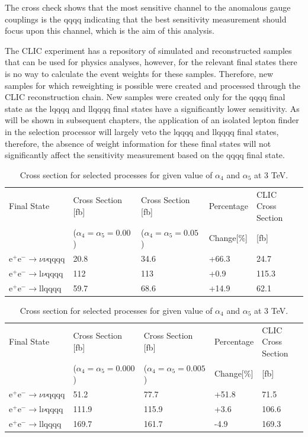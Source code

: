 The cross check shows that the most sensitive channel to the anomalous gauge couplings is the \nu{\nu}qqqq indicating that the best sensitivity measurement should focus upon this channel, which is the aim of this analysis.

The CLIC experiment has a repository of simulated and reconstructed samples that can be used for physics analyses, however, for the relevant final states there is no way to calculate the event weights for these samples. Therefore, new samples for which reweighting is possible were created and processed through the CLIC reconstruction chain. New samples were created only for the \nu{\nu}qqqq final state as the l{\nu}qqqq and llqqqq final states have a significantly lower sensitivity. As will be shown in subsequent chapters, the application of an isolated lepton finder in the selection processor will largely veto the l{\nu}qqqq and llqqqq final states, therefore, the absence of weight information for these final states will not significantly affect the sensitivity measurement based on the \nu{\nu}qqqq final state.

\begin{table}[h!]
\centering
\begin{tabular}{ l l l l l}
\hline
Final State & Cross Section [fb] & Cross Section [fb] & Percentage & CLIC Cross Section \\ 
& ($\alpha_{4} = \alpha_{5} = 0.00$) & ($\alpha_{4} = \alpha_{5} = 0.05$) & Change[\%] & [fb] \\ 
\hline
$\text{e}^{+}\text{e}^{-} \rightarrow \nu{\nu}\text{qqqq}$ & 20.8 & 34.6 & +66.3 & 24.7 \\
$\text{e}^{+}\text{e}^{-} \rightarrow \text{l}{\nu}\text{qqqq}$ & 112 & 113 & +0.9 & 115.3 \\
$\text{e}^{+}\text{e}^{-} \rightarrow \text{llqqqq}$ & 59.7 & 68.6 & +14.9 & 62.1 \\
\hline
\end{tabular}
\caption{Cross section for selected processes for given value of $\alpha_{4}$ and $\alpha_{5}$ at 1.4 TeV.}
\label{table:crosssectionsensitivity1400}

\begin{tabular}{ l l l l l}
\hline
Final State & Cross Section [fb] & Cross Section [fb] & Percentage & CLIC Cross Section \\ 
& ($\alpha_{4} = \alpha_{5} = 0.000$) & ($\alpha_{4} = \alpha_{5} = 0.005$) & Change[\%] & [fb] \\ 
\hline
$\text{e}^{+}\text{e}^{-} \rightarrow \nu{\nu}\text{qqqq}$ & 51.2 & 77.7 & +51.8 & 71.5 \\
$\text{e}^{+}\text{e}^{-} \rightarrow \text{l}{\nu}\text{qqqq}$ & 111.9 & 115.9 & +3.6 & 106.6 \\
$\text{e}^{+}\text{e}^{-} \rightarrow \text{llqqqq}$ & 169.7 & 161.7 & -4.9 & 169.3 \\
\hline
\end{tabular}
\caption{Cross section for selected processes for given value of $\alpha_{4}$ and $\alpha_{5}$ at 3 TeV.}
\label{table:crosssectionsensitivity3000}
\end{table}


